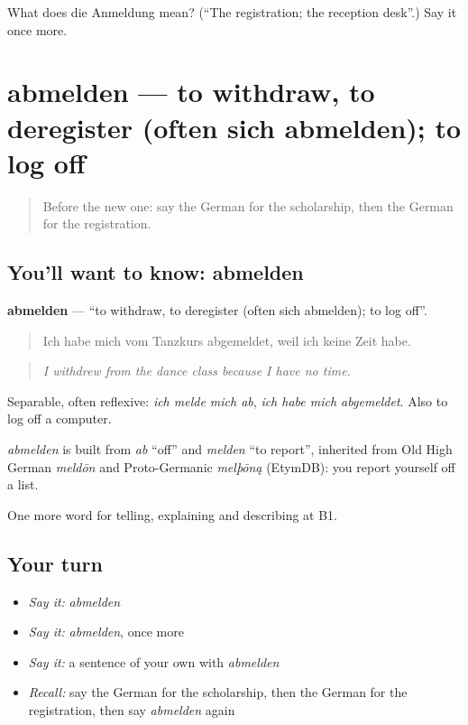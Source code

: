 \begin{tcolorbox}[breakable,colback=teal!4,colframe=teal!35!black,title={Before you move on}]
What does die Anmeldung mean? (\textquotedblleft{}The registration; the reception desk\textquotedblright{}.) Say it once more.
\end{tcolorbox}
\section[abmelden]{abmelden — to withdraw, to deregister (often sich abmelden); to log off}

\label{lesson:GE-C380-abmelden}



\begin{quote}
Before the new one: say the German for the scholarship, then the German for the registration.
\end{quote}

\subsection*{You'll want to know: abmelden}
\textbf{abmelden} — \textquotedblleft{}to withdraw, to deregister (often sich abmelden); to log off\textquotedblright{}.

\begin{quote}
Ich habe mich vom Tanzkurs abgemeldet, weil ich keine Zeit habe.
\end{quote}

\begin{quote}
\emph{I withdrew from the dance class because I have no time.}
\end{quote}

Separable, often reflexive: \emph{ich melde mich ab}, \emph{ich habe mich abgemeldet}. Also to log off a computer.

\begin{cousinweb}
\emph{abmelden} is built from \emph{ab} \textquotedblleft{}off\textquotedblright{} and \emph{melden} \textquotedblleft{}to report\textquotedblright{}, inherited from Old High German \emph{meldōn} and Proto-Germanic \emph{melþōną} (EtymDB): you report yourself off a list.
\end{cousinweb}

\begin{grammarlens}[title={What you've built}]
One more word for telling, explaining and describing at B1.
\end{grammarlens}

\subsection*{Your turn}
\begin{itemize}
\raggedright
  \item \emph{Say it:} \emph{abmelden}
  \item \emph{Say it:} \emph{abmelden}, once more
  \item \emph{Say it:} a sentence of your own with \emph{abmelden}
  \item \emph{Recall:} say the German for the scholarship, then the German for the registration, then say \emph{abmelden} again
\end{itemize}

